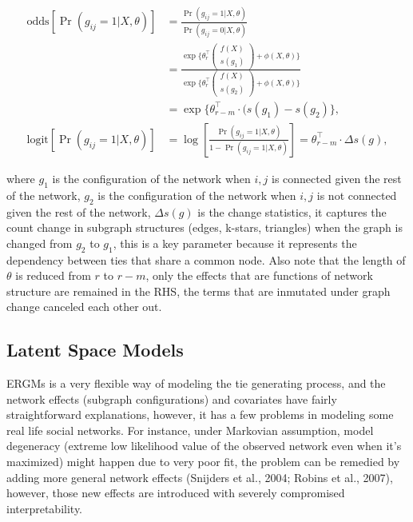 \documentclass[11pt]{article}
\begin{document}
\begin{align*}
\text{odds}[\Pr(g_{ij}=1|X,\theta)]&=\frac{\Pr(g_{ij}=1|X,\theta)}{\Pr(g_{ij}=0|X,\theta)} \\ 
&= \frac{\exp\{ \theta_r^\intercal \begin{pmatrix} f(X)\\s(g_1) \end{pmatrix} + \phi(X,\theta)\}}{\exp\{ \theta_r^\intercal \begin{pmatrix} f(X)\\s(g_2) \end{pmatrix} + \phi(X,\theta)\}}\\
&=\exp\{\theta_{r-m}^\intercal\cdot(s(g_1)-s(g_2)\},\\
\text{logit}[\Pr(g_{ij}=1|X,\theta)] &= \log[\frac{\Pr(g_{ij}=1|X,\theta)}{1-\Pr(g_{ij}=1|X,\theta)}]=\theta_{r-m}^\intercal\cdot\Delta s(g),
\end{align*}


where $g_1$ is the configuration of the network when $i, j$ is connected given the rest of the network, $g_2$ is the configuration of the network when $i, j$ is not connected given the rest of the network, $\Delta s(g)$ is the change statistics, it captures the count change in subgraph structures (edges, k-stars, triangles) when the graph is changed from $g_2$ to $g_1$, this is a key parameter because it represents the dependency between ties that share a common node. Also note that the length of $\theta$ is reduced from $r$ to $r-m$, only the effects that are functions of network structure are remained in the RHS, the terms that are inmutated under graph change canceled each other out. 

\subsection{Latent Space Models}
ERGMs is a very flexible way of modeling the tie generating process, and the network effects (subgraph configurations) and covariates have fairly straightforward explanations, however, it has a few problems in modeling some real life social networks. For instance, under Markovian assumption, model degeneracy (extreme low likelihood value of the observed network even when it's maximized) might happen due to very poor fit, the problem can be remedied by adding more general network effects (Snijders et al., 2004; Robins et al., 2007), however, those new effects are introduced with severely compromised interpretability.\\
\end{document}
